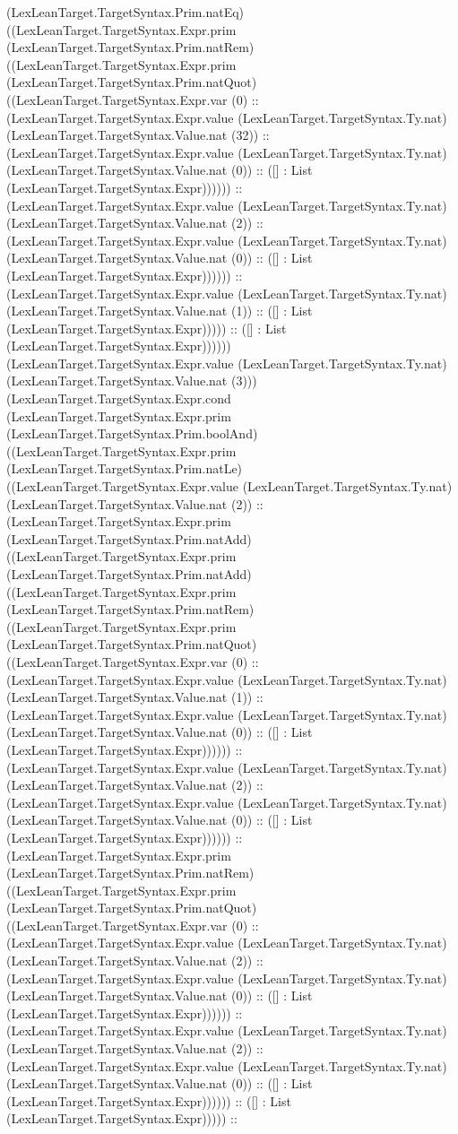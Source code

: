 \documentclass[11pt]{article}
\begin{document}
(LexLeanTarget.TargetSyntax.Prim.natEq) ((LexLeanTarget.TargetSyntax.Expr.prim (LexLeanTarget.TargetSyntax.Prim.natRem) ((LexLeanTarget.TargetSyntax.Expr.prim (LexLeanTarget.TargetSyntax.Prim.natQuot) ((LexLeanTarget.TargetSyntax.Expr.var (0) :: (LexLeanTarget.TargetSyntax.Expr.value (LexLeanTarget.TargetSyntax.Ty.nat) (LexLeanTarget.TargetSyntax.Value.nat (32)) :: (LexLeanTarget.TargetSyntax.Expr.value (LexLeanTarget.TargetSyntax.Ty.nat) (LexLeanTarget.TargetSyntax.Value.nat (0)) :: ([] : List (LexLeanTarget.TargetSyntax.Expr)))))) :: (LexLeanTarget.TargetSyntax.Expr.value (LexLeanTarget.TargetSyntax.Ty.nat) (LexLeanTarget.TargetSyntax.Value.nat (2)) :: (LexLeanTarget.TargetSyntax.Expr.value (LexLeanTarget.TargetSyntax.Ty.nat) (LexLeanTarget.TargetSyntax.Value.nat (0)) :: ([] : List (LexLeanTarget.TargetSyntax.Expr)))))) :: (LexLeanTarget.TargetSyntax.Expr.value (LexLeanTarget.TargetSyntax.Ty.nat) (LexLeanTarget.TargetSyntax.Value.nat (1)) :: ([] : List (LexLeanTarget.TargetSyntax.Expr))))) :: ([] : List (LexLeanTarget.TargetSyntax.Expr)))))) (LexLeanTarget.TargetSyntax.Expr.value (LexLeanTarget.TargetSyntax.Ty.nat) (LexLeanTarget.TargetSyntax.Value.nat (3))) (LexLeanTarget.TargetSyntax.Expr.cond (LexLeanTarget.TargetSyntax.Expr.prim (LexLeanTarget.TargetSyntax.Prim.boolAnd) ((LexLeanTarget.TargetSyntax.Expr.prim (LexLeanTarget.TargetSyntax.Prim.natLe) ((LexLeanTarget.TargetSyntax.Expr.value (LexLeanTarget.TargetSyntax.Ty.nat) (LexLeanTarget.TargetSyntax.Value.nat (2)) :: (LexLeanTarget.TargetSyntax.Expr.prim (LexLeanTarget.TargetSyntax.Prim.natAdd) ((LexLeanTarget.TargetSyntax.Expr.prim (LexLeanTarget.TargetSyntax.Prim.natAdd) ((LexLeanTarget.TargetSyntax.Expr.prim (LexLeanTarget.TargetSyntax.Prim.natRem) ((LexLeanTarget.TargetSyntax.Expr.prim (LexLeanTarget.TargetSyntax.Prim.natQuot) ((LexLeanTarget.TargetSyntax.Expr.var (0) :: (LexLeanTarget.TargetSyntax.Expr.value (LexLeanTarget.TargetSyntax.Ty.nat) (LexLeanTarget.TargetSyntax.Value.nat (1)) :: (LexLeanTarget.TargetSyntax.Expr.value (LexLeanTarget.TargetSyntax.Ty.nat) (LexLeanTarget.TargetSyntax.Value.nat (0)) :: ([] : List (LexLeanTarget.TargetSyntax.Expr)))))) :: (LexLeanTarget.TargetSyntax.Expr.value (LexLeanTarget.TargetSyntax.Ty.nat) (LexLeanTarget.TargetSyntax.Value.nat (2)) :: (LexLeanTarget.TargetSyntax.Expr.value (LexLeanTarget.TargetSyntax.Ty.nat) (LexLeanTarget.TargetSyntax.Value.nat (0)) :: ([] : List (LexLeanTarget.TargetSyntax.Expr)))))) :: (LexLeanTarget.TargetSyntax.Expr.prim (LexLeanTarget.TargetSyntax.Prim.natRem) ((LexLeanTarget.TargetSyntax.Expr.prim (LexLeanTarget.TargetSyntax.Prim.natQuot) ((LexLeanTarget.TargetSyntax.Expr.var (0) :: (LexLeanTarget.TargetSyntax.Expr.value (LexLeanTarget.TargetSyntax.Ty.nat) (LexLeanTarget.TargetSyntax.Value.nat (2)) :: (LexLeanTarget.TargetSyntax.Expr.value (LexLeanTarget.TargetSyntax.Ty.nat) (LexLeanTarget.TargetSyntax.Value.nat (0)) :: ([] : List (LexLeanTarget.TargetSyntax.Expr)))))) :: (LexLeanTarget.TargetSyntax.Expr.value (LexLeanTarget.TargetSyntax.Ty.nat) (LexLeanTarget.TargetSyntax.Value.nat (2)) :: (LexLeanTarget.TargetSyntax.Expr.value (LexLeanTarget.TargetSyntax.Ty.nat) (LexLeanTarget.TargetSyntax.Value.nat (0)) :: ([] : List (LexLeanTarget.TargetSyntax.Expr)))))) :: ([] : List (LexLeanTarget.TargetSyntax.Expr))))) :: 
\end{document}
